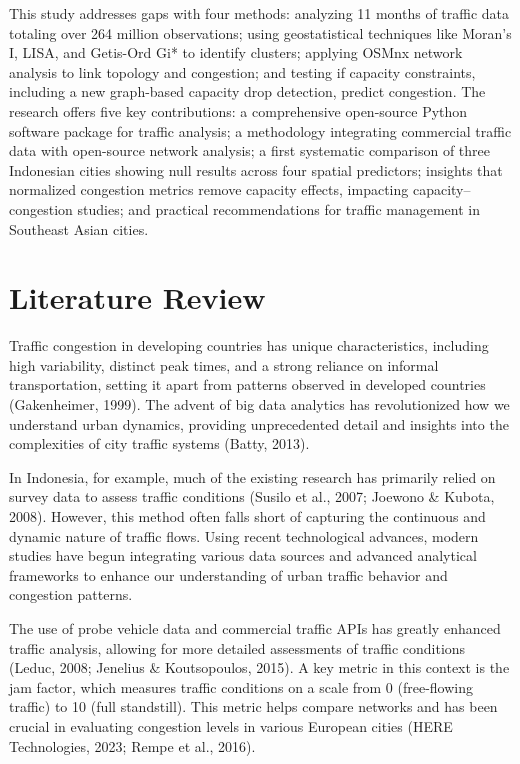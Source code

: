 \documentclass[12pt,a4paper]{article}
\begin{document}
This study addresses gaps with four methods: analyzing 11 months of traffic data totaling over 264 million observations; using geostatistical techniques like Moran’s I, LISA, and Getis-Ord Gi* to identify clusters; applying OSMnx network analysis to link topology and congestion; and testing if capacity constraints, including a new graph-based capacity drop detection, predict congestion. The research offers five key contributions: a comprehensive open-source Python software package for traffic analysis; a methodology integrating commercial traffic data with open-source network analysis; a first systematic comparison of three Indonesian cities showing null results across four spatial predictors; insights that normalized congestion metrics remove capacity effects, impacting capacity–congestion studies; and practical recommendations for traffic management in Southeast Asian cities.



\section{Literature Review}

Traffic congestion in developing countries has unique characteristics, including high variability, distinct peak times, and a strong reliance on informal transportation, setting it apart from patterns observed in developed countries (Gakenheimer, 1999). The advent of big data analytics has revolutionized how we understand urban dynamics, providing unprecedented detail and insights into the complexities of city traffic systems (Batty, 2013).

In Indonesia, for example, much of the existing research has primarily relied on survey data to assess traffic conditions (Susilo et al., 2007; Joewono \& Kubota, 2008). However, this method often falls short of capturing the continuous and dynamic nature of traffic flows. Using recent technological advances, modern studies have begun integrating various data sources and advanced analytical frameworks to enhance our understanding of urban traffic behavior and congestion patterns.

The use of probe vehicle data and commercial traffic APIs has greatly enhanced traffic analysis, allowing for more detailed assessments of traffic conditions (Leduc, 2008; Jenelius \& Koutsopoulos, 2015). A key metric in this context is the jam factor, which measures traffic conditions on a scale from 0 (free-flowing traffic) to 10 (full standstill). This metric helps compare networks and has been crucial in evaluating congestion levels in various European cities (HERE Technologies, 2023; Rempe et al., 2016).
\end{document}
